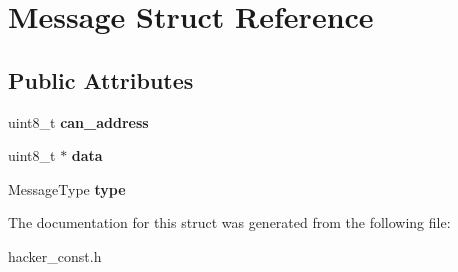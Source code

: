 \hypertarget{structMessage}{}\section{Message Struct Reference}
\label{structMessage}
\subsection*{Public Attributes}
\begin{DoxyCompactItemize}
\item 
uint8\+\_\+t {\bfseries can\+\_\+address}\hypertarget{structMessage_acc056126eaea6e24ec077efdb187c703}{}\label{structMessage_acc056126eaea6e24ec077efdb187c703}

\item 
uint8\+\_\+t $\ast$ {\bfseries data}\hypertarget{structMessage_a858e7641c732b295c70e6fdb8db0fac9}{}\label{structMessage_a858e7641c732b295c70e6fdb8db0fac9}

\item 
Message\+Type {\bfseries type}\hypertarget{structMessage_a6fc78df47d3755e088e7c658db565fc5}{}\label{structMessage_a6fc78df47d3755e088e7c658db565fc5}

\end{DoxyCompactItemize}


The documentation for this struct was generated from the following file\+:\begin{DoxyCompactItemize}
\item 
hacker\+\_\+const.\+h\end{DoxyCompactItemize}
